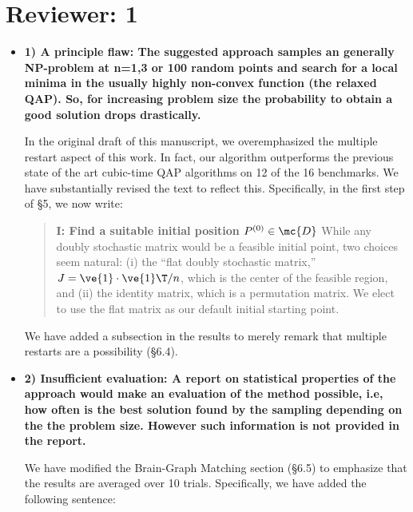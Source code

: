 \documentclass[11pt]{article}
\begin{document}

\newpage
\section{Reviewer: 1}

\begin{itemize}
	\item \textbf{1) A principle flaw:
	The suggested approach samples an generally NP-problem at n=1,3 or 100
	random points and search for a local minima in
	the usually highly non-convex function (the relaxed QAP).
	So, for increasing problem size the probability
	to obtain a good solution drops drastically.
	}

	In the original draft of this manuscript, we overemphasized the multiple restart aspect of this work.  In fact, our algorithm outperforms the previous state of the art cubic-time QAP algorithms on 12 of the 16 benchmarks. We have substantially revised the text to reflect this.  Specifically, in the first step of \S 5, we now write:
	
	\begin{quote}
		\textbf{I: Find a suitable initial position $P^{(0)} \in \mc{D}$}  While any doubly stochastic matrix would be a feasible initial point, two choices seem natural: (i) the ``flat doubly  stochastic matrix,'' $J=\ve{1} \cdot \ve{1}\T/n$, which is the center of the feasible region, and (ii) the identity matrix, which is a permutation matrix.  We elect to use the flat matrix as our default initial starting point.
	
	\end{quote} 
	
		We have added a subsection in the results to merely remark that multiple restarts are a possibility (\S 6.4). %

	\item \textbf{2) Insufficient evaluation:
	A report on statistical properties of the approach
	would make an evaluation of the method possible, i.e, how often
	is the best solution found by the sampling depending on the
	the problem size.
	However such information is not provided in the report.
	}
	
	
	We have modified the Brain-Graph Matching section (\S 6.5) to emphasize that the results are averaged over 10 trials. Specifically, we have added the following sentence:
	

\end{itemize}
\end{document}
